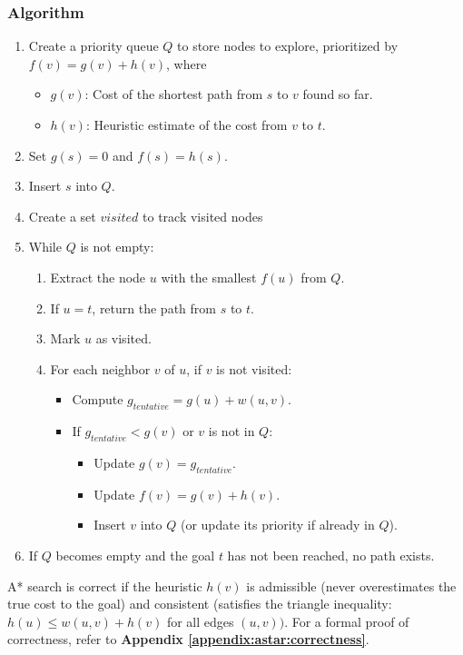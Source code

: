 		\subsubsection{Algorithm}
			\begin{enumerate}
				\item Create a priority queue $Q$ to store nodes to explore, prioritized by $f(v)=g(v)+h(v)$, where
					\begin{itemize}
						\item $g(v)$: Cost of the shortest path from $s$ to $v$ found so far.
						\item $h(v)$: Heuristic estimate of the cost from $v$ to $t$.
					\end{itemize}
				\item Set $g(s)=0$ and $f(s)=h(s)$.
				\item Insert $s$ into $Q$.
				\item Create a set $visited$ to track visited nodes
				\item While $Q$ is not empty:
					\begin{enumerate}
						\item Extract the node $u$ with the smallest $f(u)$ from $Q$.
						\item If $u=t$, return the path from $s$ to $t$.
						\item Mark $u$ as visited.
						\item For each neighbor $v$ of $u$, if $v$ is not visited:
							\begin{itemize}
								\item Compute $g_{tentative} = g(u) + w(u,v)$.
								\item If $g_{tentative} < g(v)$ or $v$ is not in $Q$:
									\begin{itemize}
										\item Update $g(v)=g_{tentative}$.
										\item Update $f(v)=g(v)+h(v)$.
										\item Insert $v$ into $Q$ (or update its priority if already in $Q$).
									\end{itemize}
							\end{itemize}
					\end{enumerate}
				\item If $Q$ becomes empty and the goal $t$ has not been reached, no path exists.
			\end{enumerate}
			A* search is correct if the heuristic $h(v)$ is admissible (never overestimates the true cost to the goal) and consistent (satisfies the triangle inequality: $h(u) \leq w(u,v)+h(v)$ for all edges $(u,v))$. For a formal proof of correctness, refer to \textbf{Appendix \ref{appendix:astar:correctness}}.
